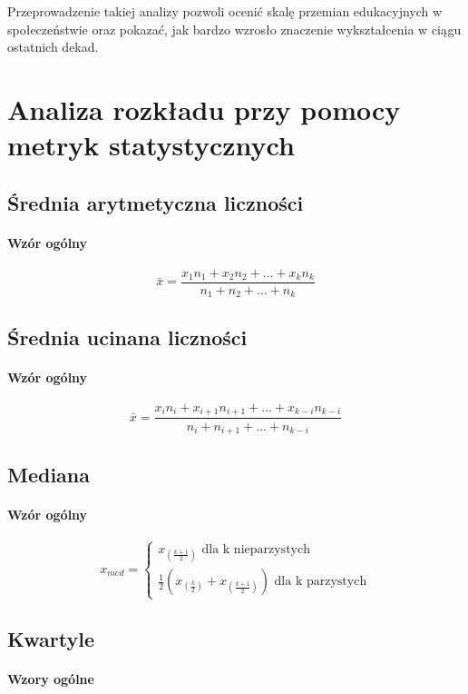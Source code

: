\documentclass[10pt]{article}
\begin{document}
Przeprowadzenie takiej analizy pozwoli ocenić skalę przemian edukacyjnych w społeczeństwie oraz pokazać, jak bardzo wzrosło znaczenie wykształcenia w ciągu ostatnich dekad.

\section{Analiza rozkładu przy pomocy metryk statystycznych}

\subsection{Średnia arytmetyczna liczności}

\paragraph{Wzór ogólny}
\[
\bar{x} = \frac{x_{1}n_{1} + x_{2}n_{2} + ... + x_{k}n_{k}}{n_{1} + n_{2} + ... + n_{k}} 
\]

\subsection{Średnia ucinana liczności}

\paragraph{Wzór ogólny}
\[
\bar{x} = \frac{x_{i}n_{i} + x_{i+1}n_{i+1} + ... + x_{k-i}n_{k-i}}{n_{i} + n_{i+1} + ... + n_{k-i}} 
\]


\subsection{Mediana}

\paragraph{Wzór ogólny}
\[
x_{med} = 
    \begin{cases}
        x_{(\frac{k+1}{2})} \text{ dla k nieparzystych}\\
        \frac{1}{2} (x_{(\frac{k}{2})} + x_{(\frac{k+1}{2})}) \text{ dla k parzystych}
    \end{cases}
\]

\subsection{Kwartyle}
\paragraph{Wzory ogólne}
\end{document}
